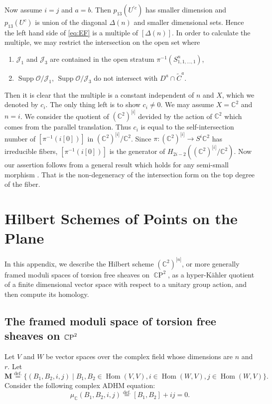 \documentclass[12pt]{amsart}
\newcommand{\cal}{\mathcal}
\theoremstyle{definition}
\theoremstyle{remark}
\numberwithin{equation}{section}
\newcommand{\defeq}{\overset{\operatorname{\scriptstyle def.}}{=}}
\newcommand{\C}{{\mathbb C}}
\newcommand{\CP}{\operatorname{\C P}}
\newcommand{\Hom}{\operatorname{Hom}}
\newcommand{\Hilb}[2]{{#1}^{\lbrack{#2}\rbrack}} %
\newcommand{\Hilbn}[1]{\Hilb{#1}{n}}
\newcommand{\shfO}{\cal O} %
\newcommand{\idl}{\cal J} %
\newcommand{\Supp}{\operatorname{Supp}} %
\newcommand{\bM}{{\mathbf M}} %
\begin{document}
Now assume $i = j$ and $a = b$.
Then $p_{13}(U^{\prime c})$ has smaller dimension and
$p_{13}(U^c)$ is union of the diagonal $\Delta(n)$ and smaller
dimensional sets.
Hence the left hand side of \eqref{eq:EF} is a multiple of $[\Delta(n)]$.
In order to calculate the multiple, we may restrict the intersection
on the open set where
\begin{enumerate}
\item $\idl_1$ and $\idl_3$ are contained in the open
stratum $\pi^{-1}(S^n_{1,1,\dots,1})$,
\item $\Supp\shfO/\idl_1$, $\Supp\shfO/\idl_3$ do not intersect with
  $D^a\cap \widetilde C^a$.
\end{enumerate}
Then it is clear that the multiple is a constant independent of $n$ and $X$,
which we denoted by $c_i$.
The only thing left is to show $c_i \ne 0$.
We may assume $X = \C^2$ and $n = i$.
We consider the quotient of $\Hilb{(\C^2)}{i}$ devided by the action of
$\C^2$ which comes from the parallel translation.
Thus $c_i$ is equal to the self-intersection number of
$[\pi^{-1}(i[0])]$ in $\Hilb{(\C^2)}{i}/\C^2$.
Since $\pi\colon \Hilb{(\C^2)}{i}\to S^i\C^2$ has irreducible fibers,
$[\pi^{-1}(i[0])]$ is the generator of $H_{2i - 2}(\Hilb{(\C^2)}{i}/\C^2)$.
Now our assertion follows from a general result which holds for any
semi-small morphism \cite[7.7.15]{Gi-book}.
That is the non-degeneracy of the intersection form on the top degree
of the fiber.
%
\appendix\section{Hilbert Schemes of Points on the Plane}
\label{sec:appendix}
%
In this appendix, we describe the Hilbert scheme $\Hilbn{(\C^2)}$, or
more generally framed moduli spaces of torsion free sheaves on $\CP^2$,
as a hyper-K\"ahler quotient of a finite dimensional vector space with
respect to a unitary group action, and then compute its homology.
%
\subsection{The framed moduli space of torsion free sheaves on
${\protect\CP^2}$}
%
Let $V$ and $W$ be vector spaces over the complex field whose
dimensions are $n$ and $r$. Let
\begin{equation*}
  \bM \defeq \{ (B_1, B_2, i, j)\mid B_1, B_2\in\Hom(V, V),
  i\in \Hom(W, V), j\in\Hom(W,V) \}.
\end{equation*}
Consider the following complex ADHM equation:
\begin{equation*}
  \mu_\C(B_1,B_2,i,j) \defeq [B_1, B_2] + ij = 0.
\end{equation*}
\end{document}
